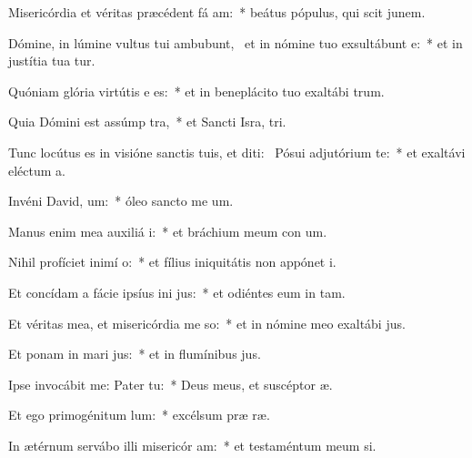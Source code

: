 \item Misericórdia et véritas præcédent fá am:~* beátus pópulus, qui scit junem.
\item Dómine, in lúmine vultus tui ambubunt,~\pscross{} et in nómine tuo exsultábunt  e:~* et in justítia tua tur.
\item Quóniam glória virtútis e  es:~* et in beneplácito tuo exaltábi  trum.
\item Quia Dómini est assúmp tra,~* et Sancti Isra,  tri.
\item Tunc locútus es in visióne sanctis tuis, et diti:~\pscross{} Pósui adjutórium  te:~* et exaltávi eléctum   a.
\item Invéni David,  um:~* óleo sancto me  um.
\item Manus enim mea auxiliá i:~* et bráchium meum con um.
\item Nihil profíciet inimí  o:~* et fílius iniquitátis non appónet  i.
\item Et concídam a fácie ipsíus ini jus:~* et odiéntes eum in  tam.
\item Et véritas mea, et misericórdia me  so:~* et in nómine meo exaltábi  jus.
\item Et ponam in mari  jus:~* et in flumínibus  jus.
\item Ipse invocábit me: Pater   tu:~* Deus meus, et suscéptor  æ.
\item Et ego primogénitum  lum:~* excélsum præ  ræ.
\item In ætérnum servábo illi misericór am:~* et testaméntum meum  si.
